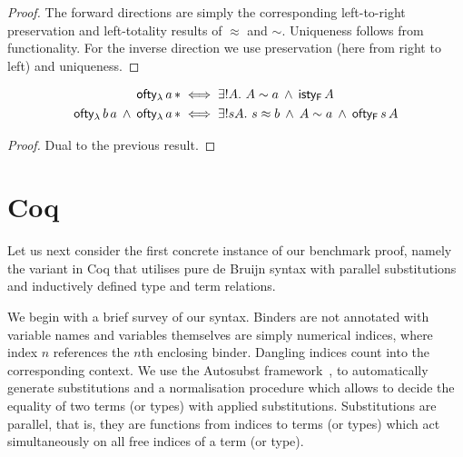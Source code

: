 \documentclass[a4paper,UKenglish]{lipics-v2016}
\newcommand{\ms}{\,}
\newcommand{\mrel}[1]{\mathrel{\ms #1 \ms}}
\newcommand{\mAnd}{\mrel{\wedge}}
\newcommand{\mExu}[1]{\ensuremath{\exists!} #1.\ms\ms}
\newcommand{\SysL}{$\lambda$2\xspace}
\newcommand{\istyFpr}{\ensuremath{\mathsf{isty_{F}}}}
\newcommand{\typingFpr}{\ensuremath{\mathsf{ofty_{F}}}}
\newcommand{\typingLpr}{\ensuremath{\mathsf{ofty_{\lambda}}}}
\newcommand{\tyr}{\mathrel{\sim}}
\newcommand{\tmr}{\mathrel{\approx}}
\newcommand{\Prp}{\ensuremath{\textrm{\textasteriskcentered}}}
\begin{document}
\begin{proof}
  The forward directions are simply the corresponding left-to-right preservation and left-totality results of $\tmr$ and $\tyr$.
  Uniqueness follows from functionality.
  For the inverse direction we use preservation (here from right to left) and uniqueness.
\end{proof}

\begin{theorem}[Reductions from \SysL to F]
  \begin{align*}
    \typingLpr\,a\,\Prp &\iff \mExu{A} A \tyr a \mAnd \istyFpr\,A\\
    \typingLpr\,b\,a \mAnd \typingLpr\,a\,\Prp &\iff \mExu{s A} s \tmr b \mAnd A \tyr a \mAnd \typingFpr\,s\,A
  \end{align*}
\end{theorem}

\begin{proof}
  Dual to the previous result.
\end{proof}

\section{Coq}
\label{sec:coq}

Let us next consider the first concrete instance of our benchmark proof, namely the variant in Coq that utilises pure de Bruijn syntax with parallel substitutions and inductively defined type and term relations.

We begin with a brief survey of our syntax.
Binders are not annotated with variable names and variables themselves are simply numerical indices, where index $n$ references the $n$th enclosing binder.
Dangling indices count into the corresponding context.
We use the Autosubst framework~\cite{DBLP:conf/itp/SchaferTS15}, to automatically generate substitutions and a normalisation procedure which allows to decide the equality of two terms (or types) with applied substitutions.
Substitutions are parallel, that is, they are functions from indices to terms (or types) which act simultaneously on all free indices of a term (or type).
\end{document}
